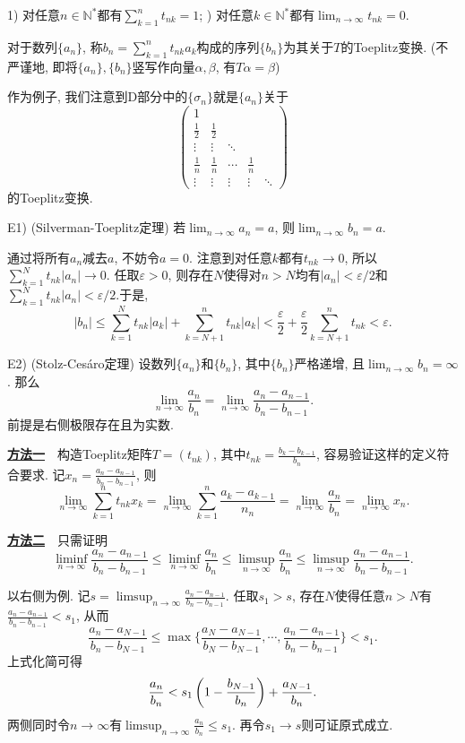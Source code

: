 1) 对任意$n \in \mathbb{N}^{*}$都有$\sum_{k=1}^{n} t_{nk}=1$; ) 对任意$k \in \mathbb{N}^{*}$都有$\lim_{n\to \infty} t_{nk}=0$.

对于数列$\{ a_n \}$, 称$b_n=\sum_{k=1}^{n} t_{nk}a_k$构成的序列$\{ b_n \}$为其关于$T$的Toeplitz变换. (不严谨地, 即将$\{ a_n \},\{ b_n \}$竖写作向量$\alpha ,\beta$, 有$T\alpha = \beta$)

作为例子, 我们注意到D部分中的$\{ \sigma _n \}$就是$\{ a_n \}$关于$$\begin{pmatrix}
 1 &  &  &  & \\
 \frac{1}{2}  & \frac{1}{2} &  &  & \\
 \vdots & \vdots & \ddots &  & \\
 \frac{1}{n}  & \frac{1}{n} & \cdots & \frac{1}{n} & \\
 \vdots & \vdots & \vdots & \vdots & \ddots
\end{pmatrix}$$的Toeplitz变换. 

E1) (Silverman-Toeplitz定理) 若$\lim_{n\to \infty} a_n=a$, 则$\lim_{n\to \infty} b_n=a$. 

\begin{solution}
	通过将所有$a_n$减去$a$, 不妨令$a=0$. 注意到对任意$k$都有$t_{nk} \to 0$, 所以$\sum_{k=1}^{N} t_{nk}|a_n| \to 0$. 任取$\varepsilon >0$, 则存在$N$使得对$n>N$均有$|a_n|<\varepsilon /2$和$\sum_{k=1}^{N} t_{nk}|a_n| < \varepsilon /2$.于是, 
	$$|b_n| \leq \sum_{k=1}^{N} t_{nk} |a_k| + \sum_{k=N+1}^{n}t_{nk}|a_k| < \frac{\varepsilon}{2} + \frac{\varepsilon}{2}\sum_{k=N+1}^{n}t_{nk} < \varepsilon .$$
\end{solution}

E2) (Stolz-Cesáro定理) 设数列$\{ a_n \}$和$\{ b_n \}$, 其中$\{ b_n \}$严格递增, 且$\lim_{n\to \infty} b_n = \infty$. 那么$$\lim_{n\to \infty} \frac{a_n}{b_n} = \lim_{n\to \infty} \frac{a_n-a_{n-1}}{b_n-b_{n-1}}. $$
前提是右侧极限存在且为实数. 

\begin{solution}
	\underline{\textbf{方法一}}~~构造Toeplitz矩阵$T=(t_{nk})$, 其中$t_{nk}=\frac{b_k-b_{k-1}}{b_n}$, 容易验证这样的定义符合要求. 记$x_n = \frac{a_n-a_{n-1}}{b_n-b_{n-1}}$, 则$$\lim_{n\to \infty} \sum_{k=1}^{n} t_{nk}x_k = \lim_{n\to \infty} \sum_{k=1}^{n} \frac{a_k-a_{k-1}}{n_n} =\lim_{n\to \infty} \frac{a_n}{b_n} = \lim_{n\to \infty} x_n. $$
	
	\underline{\textbf{方法二}}~~只需证明$$\liminf_{n\to \infty} \frac{a_n-a_{n-1}}{b_n-b_{n-1}} \leq \liminf_{n\to \infty} \frac{a_n}{b_n} \leq \limsup_{n\to \infty} \frac{a_n}{b_n} \leq \limsup_{n\to \infty} \frac{a_n-a_{n-1}}{b_n-b_{n-1}}.$$
	
	以右侧为例. 记$s = \limsup_{n\to \infty} \frac{a_n-a_{n-1}}{b_n-b_{n-1}}$. 任取$s_1>s$, 存在$N$使得任意$n>N$有$\frac{a_n-a_{n-1}}{b_n-b_{n-1}} <s_1$, 从而$$\frac{a_n-a_{N-1}}{b_n-b_{N-1}} \leq \max \big\{ \frac{a_N-a_{N-1}}{b_N-b_{N-1}},\cdots ,\frac{a_n-a_{n-1}}{b_n-b_{n-1}} \big\} < s_1. $$
	上式化简可得$$\frac{a_n}{b_n} < s_1\left( 1-\frac{b_{N-1}}{b_n} \right) + \frac{a_{N-1}}{b_n}. $$
	两侧同时令$n\to \infty$有$\limsup_{n\to \infty} \frac{a_n}{b_n} \leq s_1$. 再令$s_1\to s$则可证原式成立. 
\end{solution}


